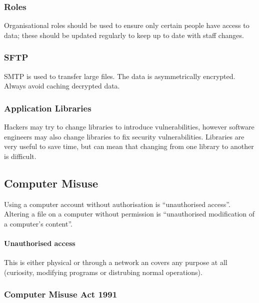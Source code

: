\subsubsection{Roles}\label{ssub:roles}

Organisational roles should be used to ensure only certain people have access to data; these should be updated regularly to keep up to date with staff changes.

\subsubsection{SFTP}\label{ssub:sftp}

SMTP is used to transfer large files.
The data is asymmetrically encrypted.
Always avoid caching decrypted data.

\subsubsection{Application Libraries}\label{ssub:application_libraries}

Hackers may try to change libraries to introduce vulnerabilities, however software engineers may also change libraries to fix security vulnerabilities.
Libraries are very useful to save time, but can mean that changing from one library to another is difficult.

\subsection{Computer Misuse}\label{sub:computer_misuse}

Using a computer account without authorisation is ``unauthorised access''.
Altering a file on a computer without permission is ``unauthorised modification of a computer's content''.

\paragraph{Unauthorised access}\label{par:unauthorised_access}

This is either physical or through a network an covers any purpose at all (curiosity, modifying programs or distrubing normal operations).

\subsubsection{Computer Misuse Act 1991}\label{ssub:computer_misuse_act_1991}

